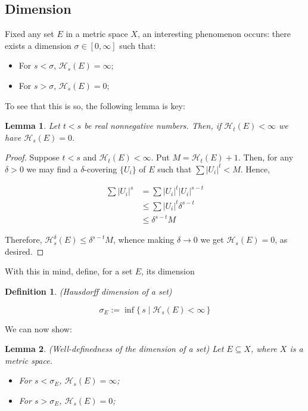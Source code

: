\documentclass[11pt]{amsart}
\newcommand{\HH}{\mathcal{H}}
\newtheorem{lemma}{Lemma}
\newtheorem{definition}{Definition}
\begin{document}
\subsection{Dimension}

Fixed any set $E$ in a metric space $X$, an interesting phenomenon occurs: there exists a dimension $\sigma \in \left[0, \infty\right]$ such that:

\begin{itemize}
\item For $s < \sigma$, $\HH_s(E) = \infty$;

\item For $s > \sigma$, $\HH_s(E) = 0$;
\end{itemize}

To see that this is so, the following lemma is key:

\begin{lemma}\label{helperdimension}
Let $t < s$ be real nonnegative numbers. Then, if $\HH_t(E) < \infty$ we have $\HH_s(E) = 0$.
\end{lemma}

\begin{proof}
Suppose $t < s$ and $\HH_t(E) < \infty$. Put $M = \HH_t(E) + 1$. Then, for any $\delta > 0$ we may find a $\delta$-covering $\{U_i\}$ of $E$ such that $\sum \lvert U_i \rvert^t < M$. Hence, 

\begin{align*}
\sum \lvert U_i \rvert^s &= \sum \lvert U_i \rvert^t \lvert U_i \rvert^{s - t}\\
&\leq \sum \lvert U_i \rvert^t \delta^{s-t}\\
&\leq \delta^{s-t} M
\end{align*}

Therefore, $\HH_s^\delta(E) \leq \delta^{s-t} M$, whence making $\delta \to 0$ we get $\HH_s(E) = 0$, as desired.
\end{proof}

With this in mind, define, for a set $E$, its dimension

\begin{definition} (Hausdorff dimension of a set)

\[\sigma_E := \inf \{\, s \mid \HH_s(E) < \infty \,\}\]
\end{definition}

We can now show:

\begin{lemma}
(Well-definedness of the dimension of a set) Let $E \subseteq X$, where $X$ is a metric space.

\begin{itemize}
\item For $s < \sigma_E$, $\HH_s(E) = \infty$;

\item For $s > \sigma_E$, $\HH_s(E) = 0$;
\end{itemize}

\end{lemma}
\end{document}
